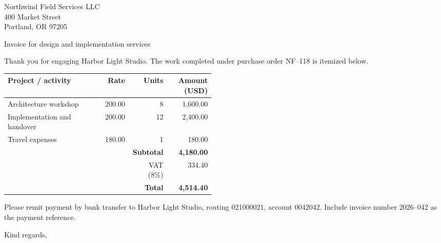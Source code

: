 \documentclass[a4paper]{letter}
\date{15 September 2026}
\begin{document}
\begin{letter}{Northwind Field Services LLC\\400 Market Street\\Portland, OR 97205}
\opening{Invoice for design and implementation services}
Thank you for engaging Harbor Light Studio. The work completed under purchase
order NF--118 is itemized below.
\vspace{8pt}
\begin{center}
\renewcommand{\arraystretch}{1.35}
\begin{tabular}{p{0.47\linewidth} r r r}
\toprule
\textbf{Project / activity} & \textbf{Rate} & \textbf{Units} & \textbf{Amount (USD)}\\
\midrule
Architecture workshop & 200.00 & 8 & 1,600.00\\
Implementation and handover & 200.00 & 12 & 2,400.00\\
Travel expenses & 180.00 & 1 & 180.00\\
\midrule
 & & \textbf{Subtotal} & \textbf{4,180.00}\\
 & & VAT (8\%) & 334.40\\
\bottomrule
 & & \textbf{Total} & \textbf{4,514.40}\\
\end{tabular}
\end{center}
Please remit payment by bank transfer to Harbor Light Studio, routing
021000021, account 0042042. Include invoice number 2026--042 as the payment
reference.
\closing{Kind regards,}
\end{letter}
\end{document}
